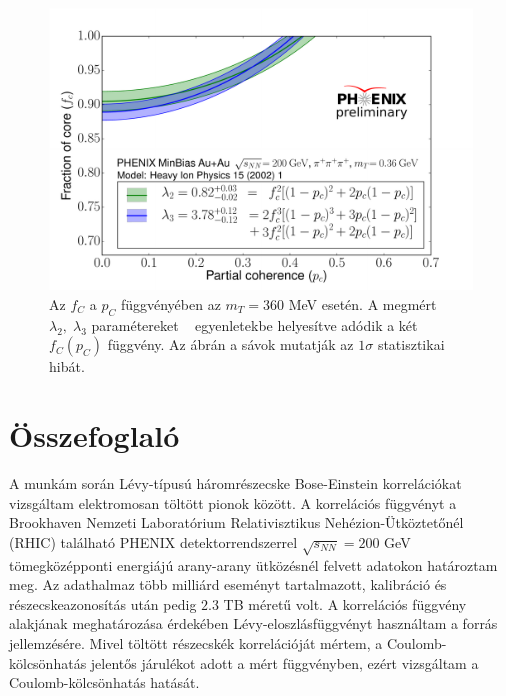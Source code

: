 \documentclass[11pt,a4paper]{article}
\numberwithin{equation}{subsection}
\numberwithin{figure}{section}
\begin{document}
\begin{figure}[H]
\centering
\includegraphics[scale=0.5]{pic/res/fcpc2_.pdf}
\caption{Az $f_C$ a $p_C$ függvényében az $m_T=360$ MeV esetén. A megmért $\lambda_2,\;\lambda_3$ paramétereket ~ egyenletekbe helyesítve adódik a két $f_C(p_C)$ függvény. Az ábrán a sávok mutatják az $1\sigma$ statisztikai hibát.}
\label{fig:fcpc2}
\end{figure}

\section{Összefoglaló}

A munkám során Lévy-típusú háromrészecske Bose-Einstein korrelációkat vizsgáltam elektromosan töltött pionok között. A korrelációs függvényt a Brookhaven Nemzeti Laboratórium Relativisztikus Nehézion-Ütköztetőnél (RHIC) található PHENIX detektorrendszerrel $\sqrt{s_{NN}}=200$ GeV tömegközépponti energiájú arany-arany ütközésnél felvett adatokon határoztam meg. Az adathalmaz több milliárd eseményt tartalmazott, kalibráció és részecskeazonosítás után pedig $2.3$ TB méretű volt. A korrelációs függvény alakjának meghatározása érdekében Lévy-eloszlásfüggvényt használtam a forrás jellemzésére. Mivel töltött részecskék korrelációját mértem, a Coulomb-kölcsönhatás jelentős járulékot adott a mért függvényben, ezért vizsgáltam a Coulomb-kölcsönhatás hatását.
\end{document}
